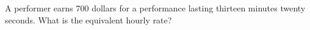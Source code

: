 A performer earns $700$ dollars for a performance lasting thirteen minutes twenty seconds. What is the equivalent hourly rate?
